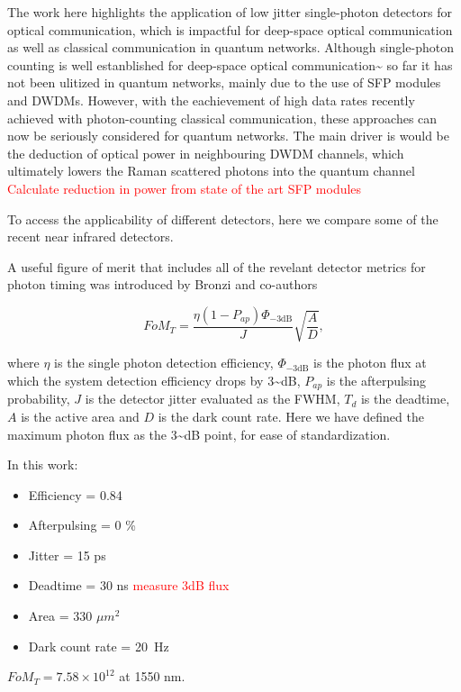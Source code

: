 \documentclass{optica-article}
\begin{document}
The work here highlights the application of low jitter single-photon detectors for optical communication, which is impactful for deep-space optical communication as well as classical communication in quantum networks. Although single-photon counting is well estanblished for deep-space optical communication\textasciitilde{}\cite{Laser lunar, DSOC} so far it has not been ulitized in quantum networks, mainly due to the use of SFP modules and DWDMs. However, with the eachievement of high data rates recently achieved with photon-counting classical communication, these approaches can now be seriously considered for quantum networks. The main driver is would be the deduction of optical power in neighbouring DWDM channels, which ultimately lowers the Raman scattered photons into the quantum channel \cite{EraerdsRaman}
\textcolor{red}{Calculate reduction in power from state of the art SFP modules}

To access the applicability of different detectors, here we compare some of the recent near infrared detectors.

A useful figure of merit that includes all of the revelant detector metrics for photon timing was introduced by Bronzi and co-authors \cite{Bronzi2016}

\[FoM_T = \frac{\eta  (1 - P_{ap})\Phi_{-3 \text{dB}}}{J} \sqrt{\frac{A}{D}},\]

where \(\eta\) is the single photon detection efficiency, \(\Phi_{-3 \text{dB}}\) is the photon flux at which the system detection efficiency drops by 3\textasciitilde dB, \(P_{ap}\) is the afterpulsing probability, \(J\) is the detector jitter evaluated as the FWHM, \(T_d\) is the deadtime, \(A\) is the active area and \(D\) is the dark count rate. Here we have defined the maximum photon flux as the 3\textasciitilde dB point, for ease of standardization.

In this work:

\begin{itemize}
\tightlist
\item
  Efficiency = 0.84
\item
  Afterpulsing = 0 \%
\item
  Jitter = 15 ps
\item
  Deadtime = 30 ns \textcolor{red}{measure 3dB flux}
\item
  Area = 330 \(\mu m^2\)
\item
  Dark count rate = 20~Hz
\end{itemize}

\(FoM_T = 7.58 \times 10^{12}\) at 1550 nm.
\end{document}
